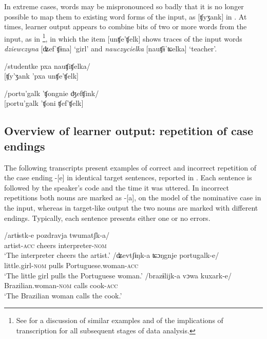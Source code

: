 In extreme cases, words may be mispronounced so badly that it is no longer possible to map them to existing word forms of the input, as [ʧyʒank] in . At times, learner output appears to combine bits of two or more words from the input, as in \footnote{See \citet{Saturno2015} for a discussion of similar examples and of the implications of transcription for all subsequent stages of data analysis.}, in which the item [unʧe'ʧelk] shows traces of the input words \textit{dziewczyna} [ʥefˈʧɨna] ‘girl’ and \textit{nauczycielka} [nauʧɨˈʨelka] ‘teacher’.

\ea%
    \label{ex:04:3}
    /studentke pxa nauʧiʧelka/\\{}
    [ʧy'ʒank 'pxa unʧe'ʧelk]
    \z

\ea%
    \label{ex:04:4}
    /portu'galk 'ʧongnie ʤefʧink/\\{}
    [portu'galk 'ʧoni ʧef'ʧelk]
    \z

\subsection{Overview of learner output: repetition of case endings}\label{sec:04:2.2}

The following transcripts present examples of correct  and incorrect  repetition of the case ending -[e] in identical target sentences, reported in . Each sentence is followed by the speaker’s code and the time it was uttered. In incorrect repetitions both nouns are marked as -[a], on the model of the nominative case in the input, whereas in target-like output the two nouns are marked with different endings. Typically, each sentence presents either one or no errors.

\ea%
    \label{ex:04:5}
    \ea\label{ex:04:5a}
    \gll    /artɨstk-e   pozdravja   twumatʃk-a/\\
            artist-\textsc{acc}  cheers    interpreter-\textsc{nom}\\
    \glt    ‘The interpreter cheers the artist.’
    \ex\label{ex:04:5b}
    \gll    /ʥevtʃɨŋk-a  ʨɔŋgnje   portugalk-e/\\
            little.girl-\textsc{nom}  pulls    Portuguese.woman-\textsc{acc}\\
    \glt    ‘The little girl pulls the Portuguese woman.’
    \ex\label{ex:04:5c}
    \gll    /brazɨlijk-a     vɔwa   kuxark-e/\\
            Brazilian.woman-\textsc{nom}  calls  cook-\textsc{acc}\\
    \glt    ‘The Brazilian woman calls the cook.’
    \z
\z

